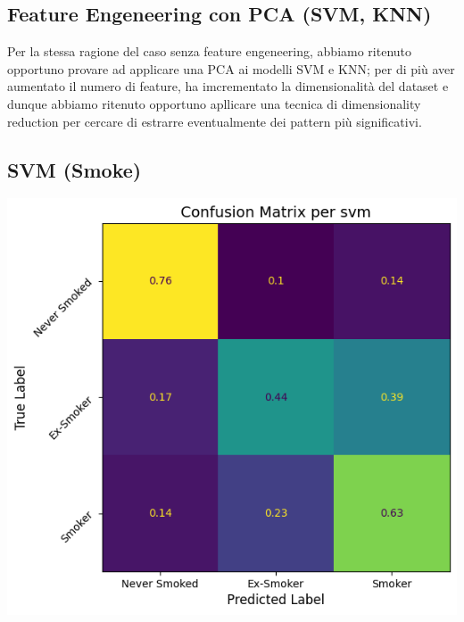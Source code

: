 \subsection{Feature Engeneering con PCA (SVM, KNN)}
Per la stessa ragione del caso senza feature engeneering, abbiamo ritenuto opportuno provare ad applicare una PCA ai modelli SVM e KNN; per di più aver aumentato il numero di feature, ha imcrementato la dimensionalità del dataset e dunque abbiamo ritenuto opportuno apllicare una tecnica di dimensionality reduction per cercare di estrarre eventualmente dei pattern più significativi.

\subsection*{SVM (Smoke) }
\begin{center}
\begin{minipage}[c]{0.50\columnwidth}
\end{minipage}\hspace{\columnsep}%
\begin{minipage}[c]{0.40\columnwidth}
\centering
\includegraphics[width=\columnwidth,height=0.75\columnwidth,keepaspectratio]{screen_results/confusion_matrix_feature_engeneering_pca_svm_s.png}
\end{minipage}
\end{center}

